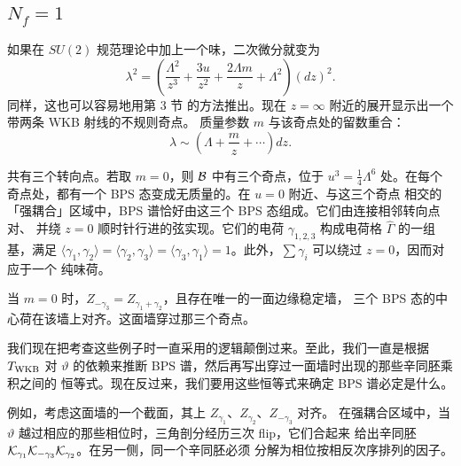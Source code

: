 \subsection{$N_f=1$}\label{sec:nf1}

如果在 $SU(2)$ 规范理论中加上一个味，二次微分就变为
\begin{equation}
\lambda^2 = \left( \frac{\Lambda^2}{z^3} + \frac{3u}{z^2}+ \frac{2
\Lambda m}{z} + \Lambda^2 \right) (dz)^2.
\end{equation}
同样，这也可以容易地用第 3 节%
的方法推出。现在 $z=\infty$ 附近的展开显示出一个带两条 WKB 射线的不规则奇点。
质量参数 $m$ 与该奇点处的留数重合：
\begin{equation}
\lambda \sim \left( \Lambda + \frac{m}{z} + \cdots \right) dz.
\end{equation}

共有三个转向点。若取 $m = 0$，则 $\mathcal{B}$ 中有三个奇点，位于 $u^3 = \frac{1}{4}
\Lambda^6$ 处。在每个奇点处，都有一个 BPS 态变成无质量的。在 $u=0$ 附近、与这三个奇点
相交的「强耦合」区域中，BPS 谱恰好由这三个 BPS 态组成。它们由连接相邻转向点对、
并绕 $z=0$ 顺时针行进的弦实现。它们的电荷 $\gamma_{1,2,3}$ 构成电荷格 $\hat \Gamma$
的一组基，满足 $\langle \gamma_1, \gamma_2\rangle=\langle \gamma_2, \gamma_3\rangle=\langle
\gamma_3, \gamma_1\rangle=1$。此外，$\sum \gamma_i$ 可以绕过 $z=0$，因而对应于一个
纯味荷。

当 $m=0$ 时，$Z_{-\gamma_3} = Z_{\gamma_1 + \gamma_2}$，且存在唯一的一面边缘稳定墙，
三个 BPS 态的中心荷在该墙上对齐。这面墙穿过那三个奇点。

我们现在把考查这些例子时一直采用的逻辑颠倒过来。至此，我们一直是根据 $T_{\rm WKB}$
对 $\vartheta$ 的依赖来推断 BPS 谱，然后再写出穿过一面墙时出现的那些辛同胚乘积之间的
恒等式。现在反过来，我们要用这些恒等式来确定 BPS 谱必定是什么。

例如，考虑这面墙的一个截面，其上 $Z_{\gamma_1}$、$Z_{\gamma_2}$、$Z_{-\gamma_3}$ 对齐。
在强耦合区域中，当 $\vartheta$ 越过相应的那些相位时，三角剖分经历三次 flip，它们合起来
给出辛同胚 $\mathcal{K}_{\gamma_1} \mathcal{K}_{-\gamma_3} \mathcal{K}_{\gamma_2}$。在另一侧，同一个辛同胚必须
分解为相位按相反次序排列的因子。

